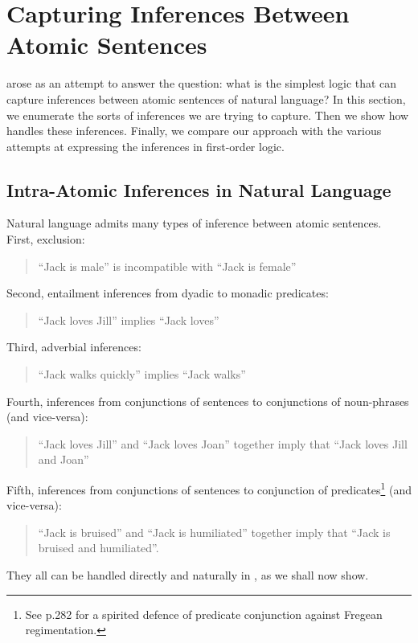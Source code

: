 
\section{Capturing Inferences Between Atomic Sentences}

\NI \ELFULL{} arose as an attempt to answer the question: what is the
simplest logic that can capture inferences between atomic sentences of
natural language?  In this section, we enumerate the sorts of
inferences we are trying to capture.  Then we show how \ELABR{}
handles these inferences.  Finally, we compare our approach with the
various attempts at expressing the inferences in first-order logic.

\subsection{Intra-Atomic Inferences in Natural Language}

\NI Natural language admits many types of inference between atomic
sentences.  First, exclusion:
\begin{quote}
``Jack is male'' is incompatible with ``Jack is female''
\end{quote}
Second, entailment inferences from dyadic to monadic predicates:
\begin{quote}
``Jack loves Jill'' implies ``Jack loves''
\end{quote}
Third, adverbial inferences:
\begin{quote}
``Jack walks quickly'' implies ``Jack walks''
\end{quote}
Fourth, inferences from conjunctions of sentences to conjunctions of noun-phrases (and vice-versa):
\begin{quote}
``Jack loves Jill'' and ``Jack loves Joan'' together imply that ``Jack loves Jill and Joan''
\end{quote}
Fifth, inferences from conjunctions of sentences to conjunction of predicates\footnote{See \cite{sommers} p.282 for a spirited defence of predicate conjunction against Fregean regimentation.} (and vice-versa):
\begin{quote}
``Jack is bruised'' and ``Jack is humiliated'' together imply that ``Jack is bruised and humiliated''.
\end{quote}

\NI They all can be handled directly and naturally in \ELABR{}, as we
shall now show.



